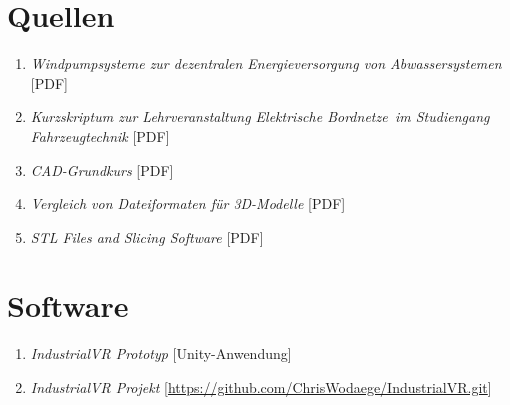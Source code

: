 

\appendix
\renewcommand\thesection{\Alph{section}}

\section{Quellen}

\begin{enumerate}[label=A\arabic*]

\item \textit{Windpumpsysteme zur dezentralen Energieversorgung von Abwassersystemen} [PDF]
\item \textit{Kurzskriptum zur Lehrveranstaltung \glqq Elektrische Bordnetze\grqq\, im Studiengang Fahrzeugtechnik} [PDF]
\item \textit{CAD-Grundkurs} [PDF]
\item \textit{Vergleich von Dateiformaten für 3D-Modelle} [PDF] 
\item \textit{STL Files and Slicing Software} [PDF] 
\end{enumerate}

\section{Software}

\begin{enumerate}[label=B\arabic*]

\item \textit{IndustrialVR Prototyp} [Unity-Anwendung]
\item \textit{IndustrialVR Projekt} [\url{https://github.com/ChrisWodaege/IndustrialVR.git}]

\end{enumerate}